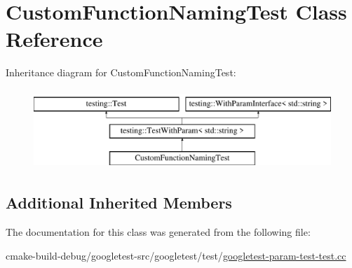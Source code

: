 \hypertarget{classCustomFunctionNamingTest}{}\section{Custom\+Function\+Naming\+Test Class Reference}
\label{classCustomFunctionNamingTest}
Inheritance diagram for Custom\+Function\+Naming\+Test\+:\begin{figure}[H]
\begin{center}
\leavevmode
\includegraphics[height=3.000000cm]{classCustomFunctionNamingTest}
\end{center}
\end{figure}
\subsection*{Additional Inherited Members}


The documentation for this class was generated from the following file\+:\begin{DoxyCompactItemize}
\item 
cmake-\/build-\/debug/googletest-\/src/googletest/test/\mbox{\hyperlink{googletest-param-test-test_8cc}{googletest-\/param-\/test-\/test.\+cc}}\end{DoxyCompactItemize}
